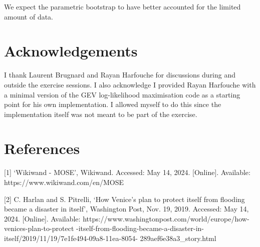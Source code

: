 \documentclass[a4paper, 12pt,oneside]{article}
\begin{document}
    We expect the parametric bootstrap to have better accounted for the limited amount of data.  
    \section*{Acknowledgements}
    I thank Laurent Brugnard and Rayan Harfouche for discussions during and outside the exercise sessions. I also acknowledge I provided Rayan Harfouche with a minimal version of the GEV log-likelihood maximisation code as a starting point for his own implementation. I allowed myself to do this since the implementation itself was not meant to be part of the exercise.  
    \section*{References}
    [1] ‘Wikiwand - MOSE’, Wikiwand. Accessed: May 14, 2024. [Online]. Available: https://www.wikiwand.com/en/MOSE

    [2] C. Harlan and S. Pitrelli, ‘How Venice’s plan to protect itself from flooding became a disaster in itself’, Washington Post, Nov. 19, 2019. Accessed: May 14, 2024. [Online]. Available: https://www.washingtonpost.com/world/europe/how-venices-plan-to-protect\newline
    -itself-from-flooding-became-a-disaster-in-itself/2019/11/19/7e1fe494-09a8-11ea-8054-\newline
    289aef6e38a3\_story.html
\end{document}
